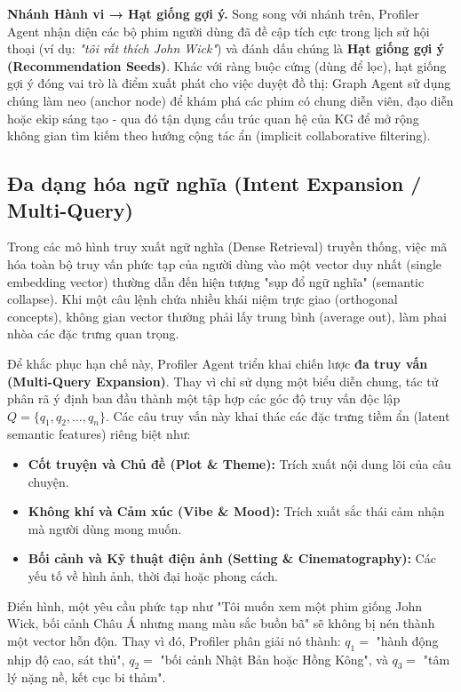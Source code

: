\textbf{Nhánh Hành vi → Hạt giống gợi ý.} Song song với nhánh trên, Profiler Agent nhận diện các bộ phim người dùng đã đề cập tích cực trong lịch sử hội thoại (ví dụ: \textit{"tôi rất thích John Wick"}) và đánh dấu chúng là \textbf{Hạt giống gợi ý (Recommendation Seeds)}. Khác với ràng buộc cứng (dùng để lọc), hạt giống gợi ý đóng vai trò là điểm xuất phát cho việc duyệt đồ thị: Graph Agent sử dụng chúng làm neo (anchor node) để khám phá các phim có chung diễn viên, đạo diễn hoặc ekip sáng tạo - qua đó tận dụng cấu trúc quan hệ của KG để mở rộng không gian tìm kiếm theo hướng cộng tác ẩn (implicit collaborative filtering).


\subsection{Đa dạng hóa ngữ nghĩa (Intent Expansion / Multi-Query)}
Trong các mô hình truy xuất ngữ nghĩa (Dense Retrieval) truyền thống, việc mã hóa toàn bộ truy vấn phức tạp của người dùng vào một vector duy nhất (single embedding vector) thường dẫn đến hiện tượng "sụp đổ ngữ nghĩa" (semantic collapse). Khi một câu lệnh chứa nhiều khái niệm trực giao (orthogonal concepts), không gian vector thường phải lấy trung bình (average out), làm phai nhòa các đặc trưng quan trọng.

Để khắc phục hạn chế này, Profiler Agent triển khai chiến lược \textbf{đa truy vấn (Multi-Query Expansion)}. Thay vì chỉ sử dụng một biểu diễn chung, tác tử phân rã ý định ban đầu thành một tập hợp các góc độ truy vấn độc lập $Q = \{q_1, q_2, \dots, q_n\}$. Các câu truy vấn này khai thác các đặc trưng tiềm ẩn (latent semantic features) riêng biệt như:
\begin{itemize}
    \item \textbf{Cốt truyện và Chủ đề (Plot \& Theme):} Trích xuất nội dung lõi của câu chuyện.
    \item \textbf{Không khí và Cảm xúc (Vibe \& Mood):} Trích xuất sắc thái cảm nhận mà người dùng mong muốn.
    \item \textbf{Bối cảnh và Kỹ thuật điện ảnh (Setting \& Cinematography):} Các yếu tố về hình ảnh, thời đại hoặc phong cách.
\end{itemize}
Điển hình, một yêu cầu phức tạp như "Tôi muốn xem một phim giống John Wick, bối cảnh Châu Á nhưng mang màu sắc buồn bã" sẽ không bị nén thành một vector hỗn độn. Thay vì đó, Profiler phân giải nó thành: $q_1 =$ "hành động nhịp độ cao, sát thủ", $q_2 =$ "bối cảnh Nhật Bản hoặc Hồng Kông", và $q_3 =$ "tâm lý nặng nề, kết cục bi thảm".

